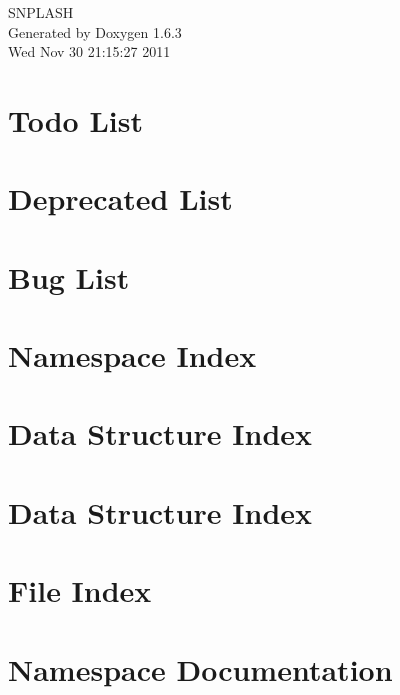 \documentclass[a4paper]{book}
\begin{document}
\hypersetup{pageanchor=false}
\begin{titlepage}
\vspace*{7cm}
\begin{center}
{\Large SNPLASH }\\
\vspace*{1cm}
{\large Generated by Doxygen 1.6.3}\\
\vspace*{0.5cm}
{\small Wed Nov 30 21:15:27 2011}\\
\end{center}
\end{titlepage}
\clearemptydoublepage
{}
\tableofcontents
\clearemptydoublepage
{}
\hypersetup{pageanchor=true}
\chapter{Todo List}
\label{todo}
\hypertarget{todo}{}

\chapter{Deprecated List}
\label{deprecated}
\hypertarget{deprecated}{}

\chapter{Bug List}
\label{bug}
\hypertarget{bug}{}

\chapter{Namespace Index}

\chapter{Data Structure Index}

\chapter{Data Structure Index}

\chapter{File Index}

\chapter{Namespace Documentation}


\end{document}
